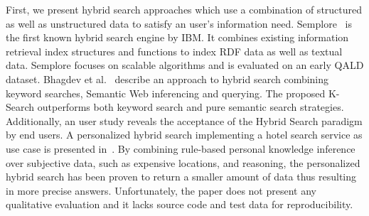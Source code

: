 First, we present hybrid search approaches which use a combination of structured as well as unstructured data to satisfy an user's information need. 
Semplore~\cite{Zhang:2007a} is the first known hybrid search engine by IBM.
It combines existing information retrieval index structures and functions to index RDF data as well as textual data. 
Semplore focuses on scalable algorithms and is evaluated on an early QALD dataset.
Bhagdev et al.~\cite{Bhagdev:2008:HSE} describe an approach to hybrid search combining keyword searches, Semantic Web inferencing and querying. 
The proposed K-Search outperforms both keyword search and pure semantic search strategies.
Additionally, an user study reveals the acceptance of the Hybrid Search paradigm by end users.
A personalized hybrid search implementing a  hotel search service as use case is presented in~\cite{DBLP:journals/kbs/Yoo12}. 
By combining rule-based personal knowledge inference over subjective data, such as expensive locations, and reasoning, the personalized hybrid search has been proven to return a smaller amount of data thus resulting in more precise answers. 
Unfortunately, the paper does not present any qualitative evaluation and it lacks source code and test data for reproducibility. 

